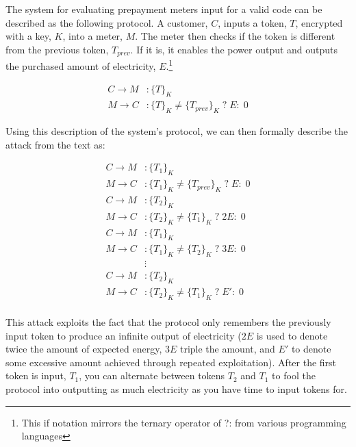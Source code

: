 \newpage


The system for evaluating prepayment meters input for a valid code can be described as the following protocol. A customer, $C$, inputs a token, $T$, encrypted with a key, $K$, into a meter, $M$. The meter then checks if the token is different from the previous token, $T_{prev}$. If it is, it enables the power output and outputs the purchased amount of electricity, $E$.\footnote{This if notation mirrors the ternary operator of ?: from various programming languages}

\begin{align*}
    C \rightarrow M & : \{T\}_K                                      \\
    M \rightarrow C & : \{T\}_K \neq \{T_{prev}\}_K \; ? \; E : \; 0
\end{align*}

Using this description of the system's protocol, we can then formally describe the attack from the text as:

\begin{align*}
    C \rightarrow M & : \{T_1\}_K                                      \\
    M \rightarrow C & : \{T_1\}_K \neq \{T_{prev}\}_K \; ? \; E : \; 0 \\
    C \rightarrow M & : \{T_2\}_K                                      \\
    M \rightarrow C & : \{T_2\}_K \neq \{T_1\}_K \; ? \; 2E :\;  0     \\
    C \rightarrow M & : \{T_1\}_K                                      \\
    M \rightarrow C & : \{T_1\}_K \neq \{T_2\}_K \; ? \; 3E :\;  0     \\
                    & \vdots                                           \\
    C \rightarrow M & : \{T_2\}_K                                      \\
    M \rightarrow C & : \{T_2\}_K \neq \{T_1\}_K \; ? \; E' :\;  0     \\
\end{align*}

This attack exploits the fact that the protocol only remembers the previously input token to produce an infinite output of electricity ($2E$ is used to denote twice the amount of expected energy, $3E$ triple the amount, and $E'$ to denote some excessive amount achieved through repeated exploitation). After the first token is input, $T_1$, you can alternate between tokens $T_2$ and $T_1$ to fool the protocol into outputting as much electricity as you have time to input tokens for.
